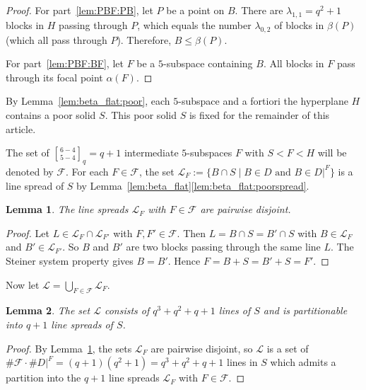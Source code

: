 \documentclass[a4paper,abstracton,12pt]{scrartcl}
\newcommand{\qbinom}[3]{\genfrac{[}{]}{0pt}{}{#1}{#2}_{#3}}
\newtheorem{lemma}{Lemma}[section]
\theoremstyle{definition}
\theoremstyle{remark}
\begin{document}
\begin{proof}
	For part~\ref{lem:PBF:PB}, let $P$ be a point on $B$.
	There are $\lambda_{1,1} = q^2 + 1$ blocks in $H$ passing through $P$, which equals the number $\lambda_{0,2}$ of blocks in $\beta(P)$ (which all pass through $P$).
	Therefore, $B \leq \beta(P)$.
	
	For part~\ref{lem:PBF:BF}, let $F$ be a $5$-subspace containing $B$.
	All blocks in $F$ pass through its focal point $\alpha(F)$.
\end{proof}

By Lemma~\ref{lem:beta_flat:poor}, each $5$-subspace and a fortiori the hyperplane $H$ contains a poor solid $S$.
This poor solid $S$ is fixed for the remainder of this article.

The set of $\qbinom{6-4}{5-4}{q} = q+1$ intermediate $5$-subspaces $F$ with $S < F < H$ will be denoted by $\mathcal{F}$.
For each $F\in\mathcal{F}$, the set $\mathcal{L}_F := \{B \cap S \mid B\in D\text{ and }B\in D|^F\}$ is a line spread of $S$ by Lemma~\ref{lem:beta_flat}\ref{lem:beta_flat:poorspread}.

\begin{lemma}
\label{lem:LF_disjoint}
The line spreads $\mathcal{L}_F$ with $F\in\mathcal{F}$ are pairwise disjoint.
\end{lemma}

\begin{proof}
Let $L\in \mathcal{L}_F\cap \mathcal{L}_{F'}$ with $F,F'\in\mathcal{F}$.
Then $L = B\cap S = B'\cap S$ with $B\in\mathcal{L}_F$ and $B'\in\mathcal{L}_{F'}$.
So $B$ and $B'$ are two blocks passing through the same line $L$.
The Steiner system property gives $B = B'$.
Hence $F = B+S = B' + S = F'$.
\end{proof}

Now let $\mathcal{L} = \bigcup_{F\in\mathcal{F}} \mathcal{L}_F$.

\begin{lemma}\label{lem:spread_partition}
The set $\mathcal{L}$ consists of $q^3 + q^2 + q + 1$ lines of $S$ and is partitionable into $q + 1$ line spreads of $S$.
\end{lemma}

\begin{proof}
	By Lemma~\ref{lem:LF_disjoint}, the sets $\mathcal{L}_F$ are pairwise disjoint, so $\mathcal{L}$ is a set of $\#\mathcal{F} \cdot \#D|^F = (q+1)(q^2 + 1) = q^3 + q^2 + q + 1$ lines in $S$ which admits a partition into the $q+1$ line spreads $\mathcal{L}_F$ with $F\in\mathcal{F}$.
\end{proof}
\end{document}
